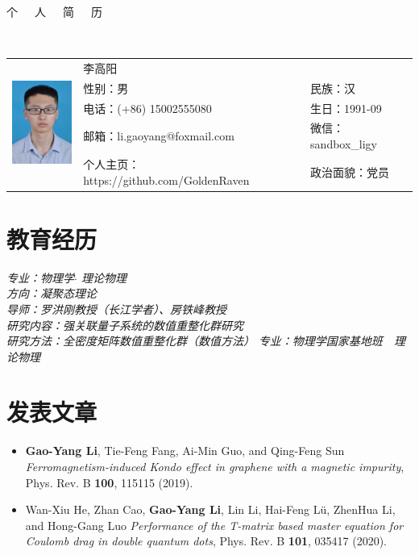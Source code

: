 \documentclass{resume}
\begin{document}

\begin{center}
\Huge{个~~~人~~~简~~~历}
\end{center}
\\
\Large{
  \begin{tabu}{ c l l }
    &
   \scshape{李高阳} &  \\
    & 性别：男 & 民族：汉 \\
    & 电话：(+86) 15002555080 & 生日：1991-09 \\
    & 邮箱：li.gaoyang@foxmail.com & 微信：sandbox\_ligy\\
    & 个人主页：https://github.com/GoldenRaven & 政治面貌：党员
  \end{tabu}
}

\section{教育经历}
\textit{专业：物理学$\cdot$ 理论物理}\\
\textit{方向：凝聚态理论}\\
\textit{导师：罗洪刚教授（长江学者）、房铁峰教授}\\
\textit{研究内容：强关联量子系统的数值重整化群研究}\\
\textit{研究方法：全密度矩阵数值重整化群（数值方法）}
\textit{专业：物理学国家基地班\ \ 理论物理}

\section{发表文章}
\begin{itemize}
\item \textbf{Gao-Yang Li}, Tie-Feng Fang, Ai-Min Guo, and Qing-Feng Sun \textit{Ferromagnetism-induced Kondo effect in graphene with a magnetic impurity}, Phys. Rev. B \textbf{100}, 115115 (2019).
\item Wan-Xiu He, Zhan Cao, \textbf{Gao-Yang Li}, Lin Li, Hai-Feng Lü, ZhenHua Li, and Hong-Gang Luo \textit{Performance of the T-matrix based master equation for Coulomb drag in double quantum dots}, Phys. Rev. B \textbf{101}, 035417 (2020).
\end{itemize}
\end{document}

